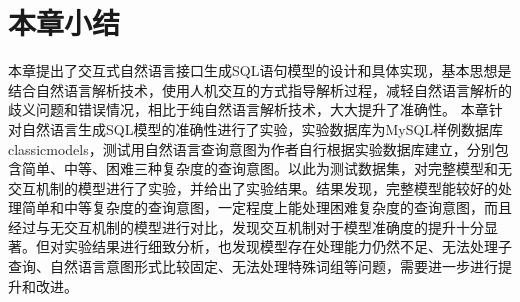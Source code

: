 \section{本章小结}
本章提出了交互式自然语言接口生成SQL语句模型的设计和具体实现，基本思想是结合自然语言解析技术，使用人机交互的方式指导解析过程，减轻自然语言解析的歧义问题和错误情况，相比于纯自然语言解析技术，大大提升了准确性。
本章针对自然语言生成SQL模型的准确性进行了实验，实验数据库为MySQL样例数据库classicmodels，测试用自然语言查询意图为作者自行根据实验数据库建立，分别包含简单、中等、困难三种复杂度的查询意图。以此为测试数据集，对完整模型和无交互机制的模型进行了实验，并给出了实验结果。结果发现，完整模型能较好的处理简单和中等复杂度的查询意图，一定程度上能处理困难复杂度的查询意图，而且经过与无交互机制的模型进行对比，发现交互机制对于模型准确度的提升十分显著。但对实验结果进行细致分析，也发现模型存在处理能力仍然不足、无法处理子查询、自然语言意图形式比较固定、无法处理特殊词组等问题，需要进一步进行提升和改进。




